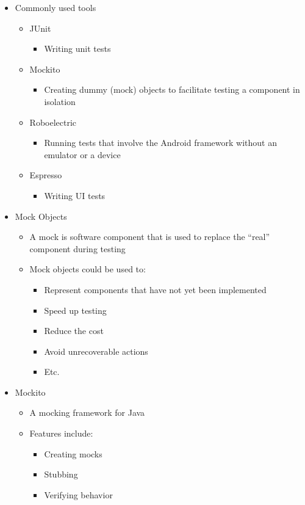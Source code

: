 \begin{itemize}
		\item Commonly used tools
		\begin{itemize}
			\item JUnit
			\begin{itemize}
				\item Writing unit tests
			\end{itemize}
			\item Mockito
			\begin{itemize}
				\item Creating dummy (mock) objects to facilitate testing a component in
				isolation
			\end{itemize}
			\item Roboelectric
			\begin{itemize}
				\item Running tests that involve the Android framework without an emulator or a device
			\end{itemize}
			\item Espresso
			\begin{itemize}
				\item Writing UI tests
			\end{itemize}
		\end{itemize}

		\item Mock Objects
		\begin{itemize}
			\item A mock is software component that is used to replace the “real” component during testing
			\item Mock objects could be used to:
			\begin{itemize}
				\item Represent components that have not yet been implemented
				\item Speed up testing
				\item Reduce the cost
				\item Avoid unrecoverable actions
				\item Etc.
			\end{itemize}
		\end{itemize}

		\item Mockito
		\begin{itemize}
			\item A mocking framework for Java
			\item Features include:
			\begin{itemize}
				\item Creating mocks
				\item Stubbing
				\item Verifying behavior
			\end{itemize}
		\end{itemize}
	\end{itemize}

%